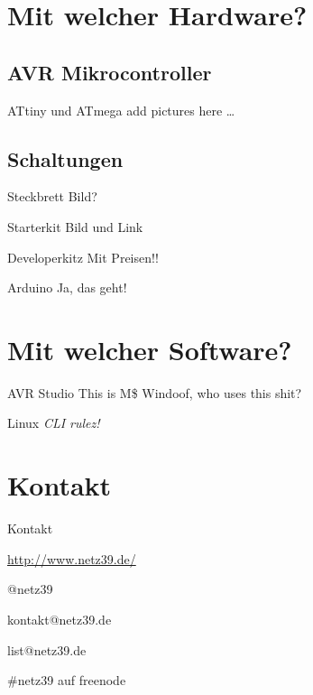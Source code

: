 \documentclass{beamer}
\begin{document}
\section{Mit welcher Hardware?}

\subsection{AVR Mikrocontroller}

\begin{frame}{ATtiny und ATmega}
    add pictures here \dots
\end{frame}

\subsection{Schaltungen}

\begin{frame}{Steckbrett}
    Bild?
\end{frame}

\begin{frame}{Starterkit}
    Bild und Link
\end{frame}

\begin{frame}{Developerkitz}
    Mit Preisen!!
\end{frame}

\begin{frame}{Arduino}
    Ja, das geht!
\end{frame}

\section{Mit welcher Software?}

\begin{frame}{AVR Studio}
    This is M\$ Windoof, who uses this shit?
\end{frame}

\begin{frame}{Linux}
    \emph{CLI rulez!}
\end{frame}

\section{Kontakt}

\begin{frame}{Kontakt}
    \begin{center}
        \begin{description}
            \item[WWW] \url{http://www.netz39.de/}
            \item[Twitter/identi.ca] @netz39
            \item[E-Mail] kontakt@netz39.de
            \item[Mailingliste] list@netz39.de
            \item[IRC] \#netz39 auf freenode
        \end{description}
    \end{center}
\end{frame}
\end{document}
